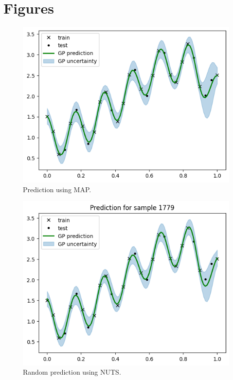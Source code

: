\pagebreak
\section{Figures}

\begin{figure}[H]
  \centering
  \includegraphics[width=.65\textwidth]{./figures/map_pred.png}
  \caption{
    Prediction using MAP.
  }
  \label{fig:gp:map:pred}
\end{figure}
%
\begin{figure}[H]
  \centering
  \includegraphics[width=.65\textwidth]{./figures/nuts_pred.png}
  \caption{
    Random prediction using NUTS.
  }
  \label{fig:gp:nuts:pred}
\end{figure}


